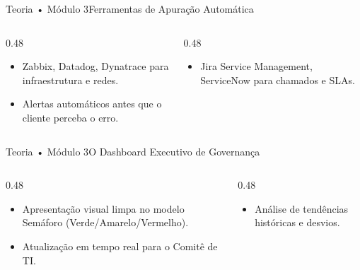 \begin{senaiframe}{Teoria • Módulo 3}{Ferramentas de Apuração Automática}
  \begin{columns}[t]
    \begin{column}{0.48\textwidth}
      \begin{tcolorbox}[senaibluecard, title={Monitoramento em Tempo Real}]
        \begin{itemize}
          \item Zabbix, Datadog, Dynatrace para infraestrutura e redes.
          \item Alertas automáticos antes que o cliente perceba o erro.
        \end{itemize}
      \end{tcolorbox}
    \end{column}
    \begin{column}{0.48\textwidth}
      \begin{tcolorbox}[senaicard, title={Gestão de ITSM}]
        \begin{itemize}
          \item Jira Service Management, ServiceNow para chamados e SLAs.
        \end{itemize}
      \end{tcolorbox}
    \end{column}
  \end{columns}
\end{senaiframe}

\begin{senaiframe}{Teoria • Módulo 3}{O Dashboard Executivo de Governança}
  \begin{columns}[t]
    \begin{column}{0.48\textwidth}
      \begin{tcolorbox}[senaigreencard, title={Princípios do Painel}]
        \begin{itemize}
          \item Apresentação visual limpa no modelo Semáforo (Verde/Amarelo/Vermelho).
          \item Atualização em tempo real para o Comitê de TI.
        \end{itemize}
      \end{tcolorbox}
    \end{column}
    \begin{column}{0.48\textwidth}
      \begin{tcolorbox}[senaicard, title={Acompanhamento}]
        \begin{itemize}
          \item Análise de tendências históricas e desvios.
        \end{itemize}
      \end{tcolorbox}
    \end{column}
  \end{columns}
\end{senaiframe}

